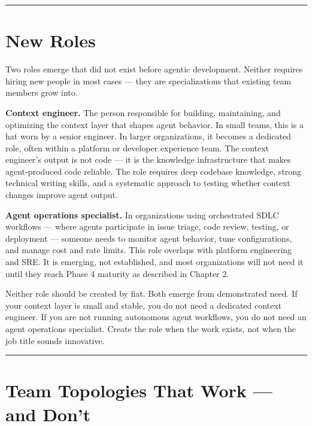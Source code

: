 \documentclass[
  a4paper,
  DIV=11,
  numbers=noendperiod]{scrreprt}
\begin{document}
\begin{center}\rule{0.5\linewidth}{0.5pt}\end{center}

\section{New Roles}\label{new-roles}

Two roles emerge that did not exist before agentic development. Neither
requires hiring new people in most cases --- they are specializations
that existing team members grow into.

\textbf{Context engineer.} The person responsible for building,
maintaining, and optimizing the context layer that shapes agent
behavior. In small teams, this is a hat worn by a senior engineer. In
larger organizations, it becomes a dedicated role, often within a
platform or developer experience team. The context engineer's output is
not code --- it is the knowledge infrastructure that makes
agent-produced code reliable. The role requires deep codebase knowledge,
strong technical writing skills, and a systematic approach to testing
whether context changes improve agent output.

\textbf{Agent operations specialist.} In organizations using
orchestrated SDLC workflows --- where agents participate in issue
triage, code review, testing, or deployment --- someone needs to monitor
agent behavior, tune configurations, and manage cost and rate limits.
This role overlaps with platform engineering and SRE. It is emerging,
not established, and most organizations will not need it until they
reach Phase 4 maturity as described in Chapter 2.

Neither role should be created by fiat. Both emerge from demonstrated
need. If your context layer is small and stable, you do not need a
dedicated context engineer. If you are not running autonomous agent
workflows, you do not need an agent operations specialist. Create the
role when the work exists, not when the job title sounds innovative.

\begin{center}\rule{0.5\linewidth}{0.5pt}\end{center}

\section{Team Topologies That Work --- and
Don't}\label{team-topologies-that-work-and-dont}
\end{document}
